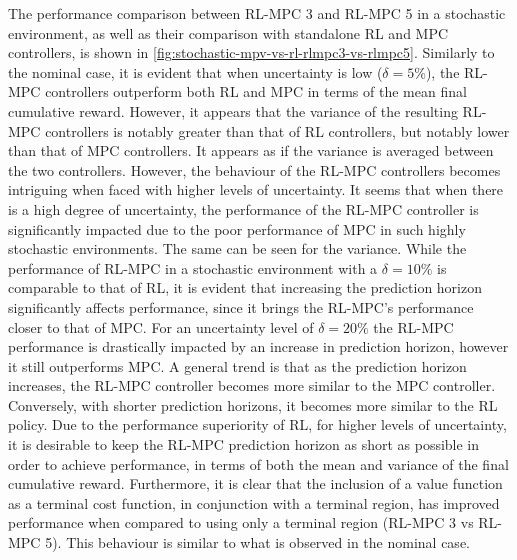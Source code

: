 The performance comparison between RL-MPC 3 and RL-MPC 5 in a stochastic environment, as well as their comparison with standalone RL and MPC controllers, is shown in \autoref{fig:stochastic-mpv-vs-rl-rlmpc3-vs-rlmpc5}. Similarly to the nominal case, it is evident that when uncertainty is low ($\delta = 5\%$), the RL-MPC controllers outperform both RL and MPC in terms of the mean final cumulative reward. However, it appears that the variance of the resulting RL-MPC controllers is notably greater than that of RL controllers, but notably lower than that of MPC controllers. It appears as if the variance is averaged between the two controllers. 
However, the behaviour of the RL-MPC controllers becomes intriguing when faced with higher levels of uncertainty. It seems that when there is a high degree of uncertainty, the performance of the RL-MPC controller is significantly impacted due to the poor performance of MPC in such highly stochastic environments. The same can be seen for the variance. While the performance of RL-MPC in a stochastic environment with a $\delta = 10\%$  is comparable to that of RL, it is evident that increasing the prediction horizon significantly affects performance, since it brings the RL-MPC's performance closer to that of MPC. For an uncertainty level of $\delta = 20\%$ the RL-MPC performance is drastically impacted by an increase in prediction horizon, however it still outperforms MPC. A general trend is that as the prediction horizon increases, the RL-MPC controller becomes more similar to the MPC controller. Conversely, with shorter prediction horizons, it becomes more similar to the RL policy. Due to the performance superiority of RL, for higher levels of uncertainty, it is desirable to keep the RL-MPC prediction horizon as short as possible in order to achieve performance, in terms of both the mean and variance of the final cumulative reward. Furthermore, it is clear that the inclusion of a value function as a terminal cost function, in conjunction with a terminal region, has improved performance when compared to using only a terminal region (RL-MPC 3 vs RL-MPC 5). This behaviour is similar to what is observed in the nominal case.

